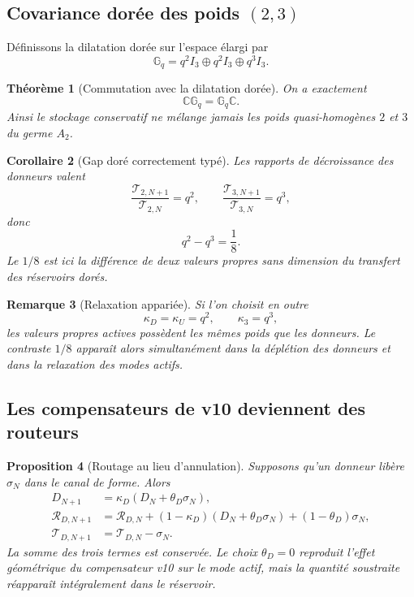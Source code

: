 \documentclass[11pt,a4paper]{article}
\newtheorem{theorem}{Théorème}[section]
\newtheorem{proposition}[theorem]{Proposition}
\newtheorem{corollary}[theorem]{Corollaire}
\newtheorem{remark}[theorem]{Remarque}
\begin{document}
\subsection{Covariance dorée des poids $(2,3)$}

Définissons la dilatation dorée sur l'espace élargi par
\[
 \mathbb G_q
 =
 q^2I_3\oplus q^2I_3\oplus q^3I_3.
\]

\begin{theorem}[Commutation avec la dilatation dorée]\label{thm:v11-golden-commute}
On a exactement
\[
 \boxed{\mathbb C\mathbb G_q=\mathbb G_q\mathbb C.}
\]
Ainsi le stockage conservatif ne mélange jamais les poids quasi-homogènes $2$ et $3$ du germe $A_2$.
\end{theorem}

\begin{corollary}[Gap doré correctement typé]\label{cor:v11-eighth}
Les rapports de décroissance des donneurs valent
\[
 \frac{\mathscr T_{2,N+1}}{\mathscr T_{2,N}}=q^2,
 \qquad
 \frac{\mathscr T_{3,N+1}}{\mathscr T_{3,N}}=q^3,
\]
donc
\[
 \boxed{q^2-q^3=\frac18.}
\]
Le $1/8$ est ici la différence de deux valeurs propres sans dimension du transfert des réservoirs dorés.
\end{corollary}

\begin{remark}[Relaxation appariée]
Si l'on choisit en outre
\[
 \kappa_D=\kappa_U=q^2,\qquad
 \kappa_3=q^3,
\]
les valeurs propres actives possèdent les mêmes poids que les donneurs. Le contraste $1/8$ apparaît alors simultanément dans la déplétion des donneurs et dans la relaxation des modes actifs.
\end{remark}

\subsection{Les compensateurs de v10 deviennent des routeurs}

\begin{proposition}[Routage au lieu d'annulation]\label{prop:v11-routing-not-cancel}
Supposons qu'un donneur libère $\sigma_N$ dans le canal de forme. Alors
\[
 \begin{aligned}
 D_{N+1}&=\kappa_D(D_N+\theta_D\sigma_N),\\
 \mathscr R_{D,N+1}
 &=\mathscr R_{D,N}
 +(1-\kappa_D)(D_N+\theta_D\sigma_N)
 +(1-\theta_D)\sigma_N,\\
 \mathscr T_{D,N+1}&=\mathscr T_{D,N}-\sigma_N.
 \end{aligned}
\]
La somme des trois termes est conservée. Le choix $\theta_D=0$ reproduit l'effet géométrique du compensateur v10 sur le mode actif, mais la quantité soustraite réapparaît intégralement dans le réservoir.
\end{proposition}
\end{document}
